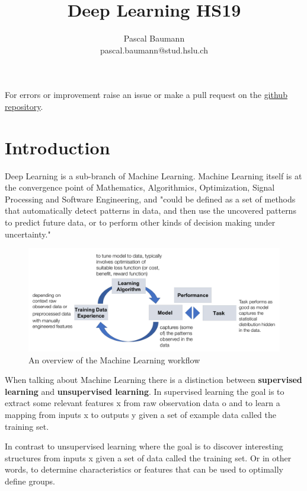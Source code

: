 \documentclass[11pt]{article}
\begin{document}
\title{Deep Learning HS19}
\author{Pascal Baumann\\pascal.baumann@stud.hslu.ch}
\maketitle

For errors or improvement raise an issue or make a pull request on the \href{https://github.com/KilnOfTheSecondFlame/mse_summaries}{github repository}.

\tableofcontents

\newpage

\section{Introduction}
Deep Learning is a sub-branch of Machine Learning. Machine Learning itself is at the convergence point of Mathematics, Algorithmics, Optimization, Signal Processing and Software Engineering, and "could be defined as a set of methods that automatically detect patterns in data, and then use the uncovered patterns to predict future data, or to perform other kinds of decision making under uncertainty."

\begin{figure}[hbt]
	\centering
	\includegraphics[width=0.8\linewidth, keepaspectratio]{img/machine_learning_overview}
	\caption{An overview of the Machine Learning workflow}
	\label{fig:machinelearningoverview}
\end{figure}

When talking about Machine Learning there is a distinction between \textbf{supervised learning} and \textbf{unsupervised learning}. In supervised learning the goal is to extract some relevant features x from raw observation data o and to learn a mapping from inputs x to outputs y given a set of example data called the training set.

In contrast to unsupervised learning where the goal is to discover interesting structures from inputs x given a set of data called the training set. Or in other words, to determine characteristics or features that can be used to optimally define groups.
\end{document}
